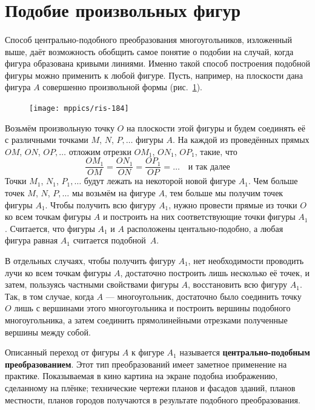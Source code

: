 \documentclass[twoside]{book}
\makeatletter
\newcommand{\rindex}[2][\imki@jobname]{%
  \index[#1]{\detokenize{#2}}%
}
\makeatother
\begin{document}
\section{Подобие произвольных фигур}

\paragraph{}\label{1938/177}
Способ центрально-подобного преобразования многоугольников, изложенный выше, даёт возможность обобщить самое понятие о подобии на случай, когда фигура образована кривыми линиями.
Именно такой способ построения подобной фигуры можно применить к любой фигуре.
Пусть, например, на плоскости дана фигура $A$ совершенно произвольной формы (рис.~\ref{1938/ris-184}).

\begin{figure}[h]
\centering
\texttt{[image: mppics/ris-184]}
\caption{}\label{1938/ris-184}
\end{figure}

Возьмём произвольную точку $O$ на плоскости этой фигуры и будем соединять её с различными точками $M$, $N$, $P,\dots$
фигуры $A$.
На каждой из проведённых прямых $OM$, $ON$, $OP,\dots$
отложим отрезки $OM_1$, $ON_1$, $OP_1$, такие, что 
\[\frac{OM_1}{OM}=\frac{ON_1}{ON}=\frac{OP_1}{OP}=\dots\quad\text{и так далее}\]
Точки $M_1$, $N_1$, $P_1,\dots$ будут лежать на некоторой новой фигуре $A_1$.
Чем больше точек $M$, $N$, $P,\dots$
мы возьмём на фигуре $A$, тем больше мы получим точек фигуры $A_1$.
Чтобы получить всю фигуру $A_1$, нужно провести прямые из точки $O$ ко всем точкам фигуры $A$ и построить на них соответствующие точки фигуры $A_1$.
Считается, что фигуры $A_1$ и $A$ расположены центально-подобно,
а любая фигура равная $A_1$ считается подобной~$A$.

В отдельных случаях, чтобы получить фигуру $A_1$, нет необходимости проводить лучи ко всем точкам фигуры $A$, достаточно построить лишь несколько её точек, и затем, пользуясь частными свойствами фигуры $A$, восстановить всю фигуру $A_1$.
Так, в том случае, когда $A$ — многоугольник, достаточно было соединить точку $O$ лишь с вершинами этого многоугольника и построить вершины подобного многоугольника, а затем соединить прямолинейными отрезками полученные вершины между собой.

{\sloppy

Описанный переход от фигуры $A$ к фигуре $A_1$ называется \rindex{центрально-подобное преобразование}\textbf{центрально-подобным преобразованием}. 
Этот тип преобразований имеет заметное применение на практике.
Показываемая в кино картина на экране подобна изображению, сделанному на плёнке;
технические чертежи планов и фасадов зданий, планов местности, планов городов
получаются в результате подобного преобразования.

}
\end{document}
